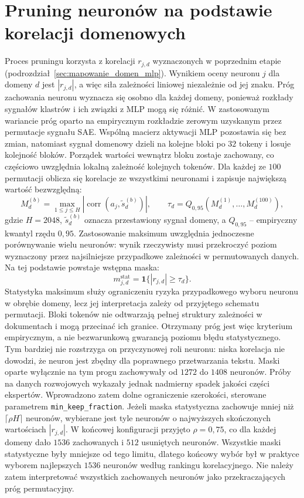 \section{Pruning neuronów na podstawie korelacji domenowych}
\label{sec:pruning_korelacyjny}

Proces pruningu korzysta z korelacji $r_{j,d}$ wyznaczonych w poprzednim etapie (podrozdział~\ref{sec:mapowanie_domen_mlp}). Wynikiem oceny neuronu $j$ dla domeny $d$ jest $|r_{j,d}|$, a więc siła zależności liniowej niezależnie od jej znaku. Próg zachowania neuronu wyznacza się osobno dla każdej domeny, ponieważ rozkłady sygnałów klastrów i ich związki z MLP mogą się różnić. \newline
W zastosowanym wariancie próg oparto na empirycznym rozkładzie zerowym uzyskanym przez permutacje sygnału SAE. Wspólną macierz aktywacji MLP pozostawia się bez zmian, natomiast sygnał domenowy dzieli na kolejne bloki po $32$ tokeny i losuje kolejność bloków. Porządek wartości wewnątrz bloku zostaje zachowany, co częściowo uwzględnia lokalną zależność kolejnych tokenów. Dla każdej ze $100$ permutacji oblicza się korelacje ze wszystkimi neuronami i zapisuje największą wartość bezwzględną:
\[
M_d^{(b)}=\max_{1\leq j\leq H}
\left|\operatorname{corr}\left(a_j,\widetilde{s}_d^{(b)}\right)\right|,
\qquad
\tau_d=Q_{0{,}95}\left(M_d^{(1)},\ldots,M_d^{(100)}\right),
\]
gdzie $H=2048$, $\widetilde{s}_d^{(b)}$ oznacza przestawiony sygnał domeny, a $Q_{0{,}95}$ -- empiryczny kwantyl rzędu $0{,}95$. Zastosowanie maksimum uwzględnia jednoczesne porównywanie wielu neuronów: wynik rzeczywisty musi przekroczyć poziom wyznaczony przez najsilniejsze przypadkowe zależności w permutowanych danych. \newline
Na tej podstawie powstaje wstępna maska:
\[
m_{j,d}^{\mathrm{stat}}=\mathbf{1}\{|r_{j,d}|\geq\tau_d\}.
\]
Statystyka maksimum służy ograniczeniu ryzyka przypadkowego wyboru neuronu w obrębie domeny, lecz jej interpretacja zależy od przyjętego schematu permutacji. Bloki tokenów nie odtwarzają pełnej struktury zależności w dokumentach i mogą przecinać ich granice. Otrzymany próg jest więc kryterium empirycznym, a nie bezwarunkową gwarancją poziomu błędu statystycznego. Tym bardziej nie rozstrzyga on przyczynowej roli neuronu: niska korelacja nie dowodzi, że neuron jest zbędny dla poprawnego przetwarzania tekstu. \newline
Maski oparte wyłącznie na tym progu zachowywały od $1272$ do $1408$ neuronów. Próby na danych rozwojowych wykazały jednak nadmierny spadek jakości części ekspertów. Wprowadzono zatem dolne ograniczenie szerokości, sterowane parametrem \texttt{min\_keep\_fraction}. Jeżeli maska statystyczna zachowuje mniej niż $\lceil\rho H\rceil$ neuronów, wybierane jest tyle neuronów o najwyższych skończonych wartościach $|r_{j,d}|$. W końcowej konfiguracji przyjęto $\rho=0{,}75$, co dla każdej domeny dało $1536$ zachowanych i $512$ usuniętych neuronów. Wszystkie maski statystyczne były mniejsze od tego limitu, dlatego końcowy wybór był w praktyce wyborem najlepszych $1536$ neuronów według rankingu korelacyjnego. Nie należy zatem interpretować wszystkich zachowanych neuronów jako przekraczających próg permutacyjny. \newline
